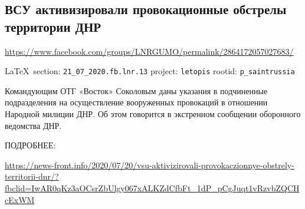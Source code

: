  
 

\subsection{ВСУ активизировали провокационные обстрелы территории ДНР}
\label{sec:21_07_2020.fb.lnr.13}
\url{https://www.facebook.com/groups/LNRGUMO/permalink/2864172057027683/}
  
\vspace{0.5cm}
{\small\LaTeX~section: \verb|21_07_2020.fb.lnr.13| project: \verb|letopis| rootid: \verb|p_saintrussia|}
\vspace{0.5cm}

Командующим ОТГ «Восток» Соколовым даны указания в подчиненные подразделения на
осуществление вооруженных провокаций в отношении Народной милиции ДНР. Об этом
говорится в экстренном сообщении оборонного ведомства ДНР.

ПОДРОБНЕЕ: 

\url{https://news-front.info/2020/07/20/vsu-aktivizirovali-provokaczionnye-obstrely-territorii-dnr/?fbclid=IwAR0qKz3aOCsrZbUlgy067xALKZdCfbFt_1dP_pCgJuqt1vRzvbZQCHcExWM}
  
